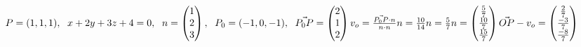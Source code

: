 \subsection{}
\begin{math}
    P=(1,1,1),
    \hspace{6px}
    x+2y+3z+4=0,
    \hspace{6px}
    n=\begin{pmatrix}
        1\\
        2\\
        3
    \end{pmatrix},
    \hspace{6px}
    P_0=(-1,0,-1),
    \hspace{6px}
    \vec{P_0P}=\begin{pmatrix}
        2\\
        1\\
        2
    \end{pmatrix}
    \\
    v_o
    =\frac{\vec{P_0P}\cdot n}{n\cdot n}n
    =\frac{10}{14}n
    =\frac{5}{7}n
    =\begin{pmatrix}
        \frac{5}{7}\\
        \frac{10}{7}\\
        \frac{15}{7}
    \end{pmatrix}
    \\
    \vec{OP}-v_o
    =\begin{pmatrix}
        \frac{2}{7}\\
        \frac{-3}{7}\\
        \frac{-8}{7}
    \end{pmatrix}
\end{math}